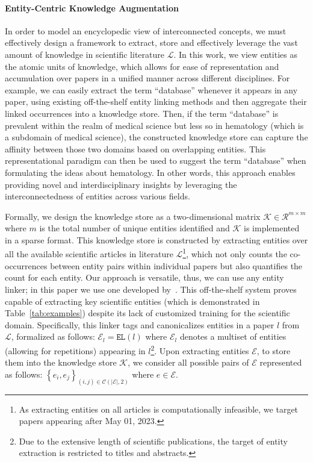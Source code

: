 \documentclass[11pt]{article}
\begin{document}
\paragraph{Entity-Centric Knowledge Augmentation}
In order to model an encyclopedic view of interconnected concepts, we must effectively design a framework to extract, store and effectively leverage the vast amount of knowledge in scientific literature $\mathcal{L}$. In this work, we view entities as the atomic units of knowledge, which allows for ease of representation and accumulation over papers in a unified manner across different disciplines. For example, we can easily extract the term ``database'' whenever it appears in any paper, using existing off-the-shelf entity linking methods and then aggregate their linked occurrences into a knowledge store. Then, if the term ``database'' is prevalent within the realm of medical science but less so in hematology (which is a subdomain of medical science), the constructed knowledge store can capture the affinity between those two domains based on overlapping entities. This representational paradigm can then be used to suggest the term ``database'' when formulating the ideas about hematology. In other words, this approach enables providing novel and interdisciplinary insights by leveraging the interconnectedness of entities across various fields.

Formally, we design the knowledge store as a two-dimensional matrix $\mathcal{K} \in \mathcal{R}^{m \times m}$ where $m$ is the total number of unique entities identified and $\mathcal{K}$ is implemented in a sparse format. This knowledge store is constructed by extracting entities over all the available scientific articles in literature $\mathcal{L}$\footnote{As extracting entities on all articles is computationally infeasible, we target papers appearing after May 01, 2023.}, which not only counts the co-occurrences between entity pairs within individual papers but also quantifies the count for each entity. Our approach is versatile, thus, we can use any entity linker; in this paper we use one developed by~\citet{blink}. This off-the-shelf system proves capable of extracting key scientific entities (which is demonstrated in Table~\ref{tab:examples}) despite its lack of customized training for the scientific domain. Specifically, this linker tags and canonicalizes entities in a paper $l$ from $\mathcal{L}$, formalized as follows: $\mathcal{E}_l = \texttt{EL}(l)$ where $\mathcal{E}_l$ denotes a multiset of entities (allowing for repetitions) appearing in $l$\footnote{Due to the extensive length of scientific publications, the target of entity extraction is restricted to titles and abstracts.}. Upon extracting entities $\mathcal{E}$, to store them into the knowledge store $\mathcal{K}$, we consider all possible pairs of $\mathcal{E}$ represented as follows: $\left\{ e_i, e_j \right\}_{(i, j) \in \mathcal{C}(|\mathcal{E}|, 2)}$ where $e \in \mathcal{E}$.
\end{document}
